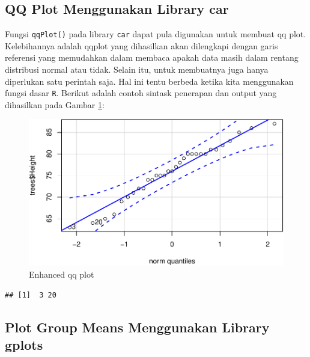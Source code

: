 \documentclass[]{book}
\newenvironment{Shaded}{\begin{snugshade}}{\end{snugshade}}
\newcommand{\KeywordTok}[1]{\textcolor[rgb]{0.13,0.29,0.53}{\textbf{#1}}}
\newcommand{\CommentTok}[1]{\textcolor[rgb]{0.56,0.35,0.01}{\textit{#1}}}
\newcommand{\OperatorTok}[1]{\textcolor[rgb]{0.81,0.36,0.00}{\textbf{#1}}}
\newcommand{\NormalTok}[1]{#1}
\begin{document}
\subsection{QQ Plot Menggunakan Library
car}\label{qq-plot-menggunakan-library-car}

Fungsi \texttt{qqPlot()} pada library \texttt{car} dapat pula digunakan
untuk membuat qq plot. Kelebihannya adalah qqplot yang dihasilkan akan
dilengkapi dengan garis referensi yang memudahkan dalam membaca apakah
data masih dalam rentang distribusi normal atau tidak. Selain itu, untuk
membuatnya juga hanya diperlukan satu perintah saja. Hal ini tentu
berbeda ketika kita menggunakan fungsi dasar \texttt{R}. Berikut adalah
contoh sintask penerapan dan output yang dihasilkan pada Gambar
\ref{fig:carqqplot}:

\begin{Shaded}
\end{Shaded}

\begin{figure}

{\centering \includegraphics[width=0.7\linewidth]{EnvStat_files/figure-latex/carqqplot-1} 

}

\caption{Enhanced qq plot}\label{fig:carqqplot}
\end{figure}

\begin{verbatim}
## [1]  3 20
\end{verbatim}

\subsection{Plot Group Means Menggunakan Library
gplots}\label{plot-group-means-menggunakan-library-gplots}
\end{document}
